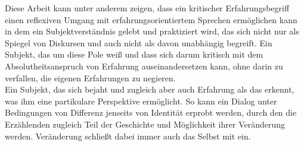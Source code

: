 \noindent Diese Arbeit kann unter anderem zeigen, dass ein kritischer Erfahrungsbegriff
einen reflexiven Umgang mit erfahrungsorientiertem Sprechen ermöglichen kann in
dem ein Subjektverständnis gelebt und praktiziert wird, das sich nicht nur als
Spiegel von Diskursen und auch nicht als davon unabhängig begreift. Ein Subjekt, das um
diese Pole weiß und dass sich darum kritisch mit dem Absolutheitsanspruch von Erfahrung auseinandersetzen kann, ohne darin zu verfallen, die eigenen
Erfahrungen zu negieren.\\

\noindent Ein Subjekt, das sich bejaht und zugleich aber auch Erfahrung als das erkennt,
was ihm eine partikulare Perspektive ermöglicht. So kann ein Dialog unter
Bedingungen von Differenz jenseits von Identität erprobt werden, durch den die
Erzählenden zugleich Teil der Geschichte und Möglichkeit ihrer Veränderung
werden. Veränderung schließt dabei immer auch das Selbst mit ein.
